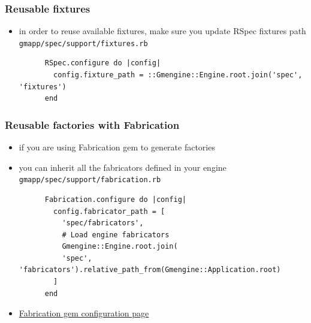 \documentclass[compress]{beamer}
\begin{document}
\begin{frame}[fragile]
\frametitle{Reusable fixtures}
\begin{itemize}
  \item in order to reuse available fixtures, make sure you update RSpec fixtures path
    \\
    \texttt{gmapp/spec/support/fixtures.rb}
    \begin{verbatim}
      RSpec.configure do |config|
        config.fixture_path = ::Gmengine::Engine.root.join('spec', 'fixtures')
      end
    \end{verbatim}
\end{itemize}
\end{frame}

\begin{frame}[fragile]
\frametitle{Reusable factories with Fabrication}
\begin{itemize}
  \item if you are using Fabrication gem to generate factories
  \item you can inherit all the fabricators defined in your engine
    \texttt{gmapp/spec/support/fabrication.rb}
    \begin{verbatim}
      Fabrication.configure do |config|
        config.fabricator_path = [
          'spec/fabricators',
          # Load engine fabricators
          Gmengine::Engine.root.join(
          'spec', 'fabricators').relative_path_from(Gmengine::Application.root)
        ]
      end
    \end{verbatim}
  \item \href{http://www.fabricationgem.org/#!configuration}{Fabrication gem configuration page}
\end{itemize}
\end{frame}
\end{document}
